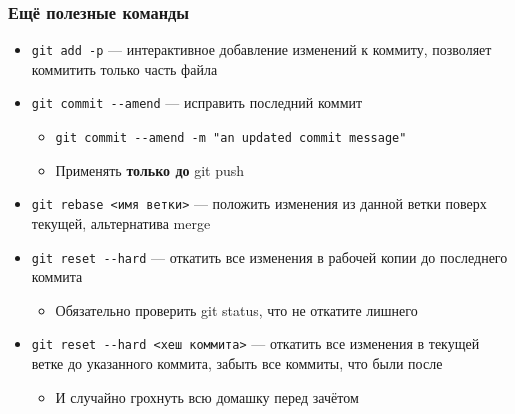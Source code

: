 \documentclass{../slides-style}
\begin{document}
    \begin{frame}[fragile]
        \frametitle{Ещё полезные команды}
        \begin{itemize}
            \item \verb|git add -p| --- интерактивное добавление изменений к коммиту, позволяет коммитить только часть файла
            \item \verb|git commit --amend| --- исправить последний коммит
            \begin{itemize}
                \item \verb|git commit --amend -m "an updated commit message"|
                \item Применять \textbf{только до} git push
            \end{itemize}
            \item \verb|git rebase <имя ветки>| --- положить изменения из данной ветки поверх текущей, альтернатива merge
            \item \verb|git reset --hard| --- откатить все изменения в рабочей копии до последнего коммита
            \begin{itemize}
                \item Обязательно проверить git status, что не откатите лишнего
            \end{itemize}
            \item \verb|git reset --hard <хеш коммита>| --- откатить все изменения в текущей ветке до указанного коммита, забыть все коммиты, что были после
            \begin{itemize}
                \item И случайно грохнуть всю домашку перед зачётом
            \end{itemize}
        \end{itemize}
    \end{frame}
\end{document}
